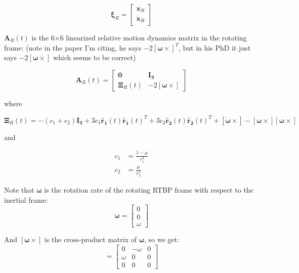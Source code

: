 \documentclass[a4paper]{article}
\begin{document}
\begin{equation*}
\boldsymbol{\xi}_R = \begin{bmatrix}
									\mathbf{x}_R \\
									\dot{\mathbf{x}}_R
									\end{bmatrix}
\end{equation*}

\(\mathbf{A}_R(t)\) is the 6\(\times\)6 linearized relative motion dynamics matrix in the rotating frame: (note in the paper I'm citing, he says \(-2 [\boldsymbol{\omega} \times]^T\), but in his PhD it just says \(-2 [\boldsymbol{\omega} \times]\) which seems to be correct)

\begin{equation} \label{eq:RelmoDynMatrix}
\mathbf{A}_R(t) = \begin{bmatrix}
								\mathbf{0}          & \mathbf{I_3} \\
								\mathbf{\Xi}_R(t) & -2 [\boldsymbol{\omega} \times]
								\end{bmatrix}
\end{equation}

where

\begin{equation*}
\mathbf{\Xi}_R(t) = -(c_1 + c_2)\mathbf{I_3} 
								+ 3c_1\mathbf{\hat{r}_1}(t) \mathbf{\hat{r}_1}(t)^T 
								+ 3c_2\mathbf{\hat{r}_2}(t) \mathbf{\hat{r}_2}(t)^T 
								+ [\boldsymbol{\dot{\omega}} \times] 
								- [\boldsymbol{\omega}\times][\boldsymbol{\omega}\times]
\end{equation*}

and

\begin{equation*}
\begin{aligned}
c_1 &= \frac{1- \mu}{r_1^3} \\
c_2 &= \frac{\mu}{r_2^3}
\end{aligned}
\end{equation*}

Note that \(\boldsymbol{\omega}\) is the rotation rate of the rotating RTBP frame with respect to the inertial frame:
\begin{equation*}
\boldsymbol{\omega} = \begin{bmatrix}
					0 \\ 
					0 \\
					\omega
					\end{bmatrix}
\end{equation*}

And  \([\boldsymbol{\omega}\times]\) is the cross-product matrix of \(\boldsymbol{\omega}\), so we get:
\begin{equation*}
[\boldsymbol{\omega}\times] = \begin{bmatrix}
								0           & -\omega & 0 \\ 
								\omega & 0             & 0 \\
								0           & 0             & 0
								\end{bmatrix}
\end{equation*}
\end{document}
